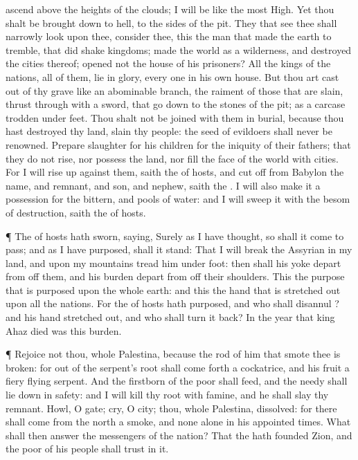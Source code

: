 {ascend above the
heights of the
clouds; I will be
like the most
High.
Yet thou shalt be brought
down to
hell, to the
sides of the
pit.
They that
see thee shall narrowly
look upon thee,
{}
consider thee,
{} this the
man that made the
earth to
tremble, that did
shake
kingdoms;
made the
world as a
wilderness, and
destroyed the
cities thereof;
{}
opened not the
house of his
prisoners?
All the
kings of the
nations,
{} all of them,
lie in
glory, every
one in his own
house.
But thou art cast
out of thy
grave like an
abominable
branch,
{} the
raiment of those that are
slain, thrust
through with a
sword, that go
down to the
stones of the
pit; as a
carcase trodden under
feet.
Thou shalt not be
joined with them in
burial, because thou hast
destroyed thy
land,
{}
slain thy
people: the
seed of
evildoers shall
never be
renowned.
Prepare
slaughter for his
children for the
iniquity of their
fathers; that they do
not
rise, nor
possess the
land, nor
fill the
face of the
world with
cities.
For I will rise
up against them,
saith the
{} of
hosts, and cut
off from
Babylon the
name, and
remnant, and
son, and
nephew,
saith the
{}.
I will also
make it a
possession for the
bittern, and
pools of
water: and I will
sweep it with the
besom of
destruction,
saith the
{} of
hosts.
\par }{\PP {}¶ The
{} of
hosts hath
sworn,
saying, Surely as I have
thought, so shall it come to pass; and as I have
purposed,
{} shall it
stand:
That I will
break the
Assyrian in my
land, and upon my
mountains tread him under
foot: then shall his
yoke
depart from off them, and his
burden
depart from off their
shoulders.
This
{} the
purpose that is
purposed upon the whole
earth: and this
{} the
hand that is stretched
out upon all the
nations.
For the
{} of
hosts hath
purposed, and who shall
disannul
{}? and his
hand
{} stretched
out, and who shall turn it
back?
In the
year that
king
Ahaz
died was this
burden.
\par }{\PP {}¶
Rejoice not thou, whole
Palestina, because the
rod of him that
smote thee is
broken: for out of the
serpent’s
root shall come
forth a
cockatrice, and his
fruit
{} a
fiery
flying
serpent.
And the
firstborn of the
poor shall
feed, and the
needy shall lie
down in
safety: and I will
kill thy
root with
famine, and he shall
slay thy
remnant.
Howl, O
gate;
cry, O
city; thou, whole
Palestina,
{}
dissolved: for there shall
come from the
north a
smoke, and none
{}
alone in his appointed
times.
What shall
{} then
answer the
messengers of the
nation? That the
{} hath
founded
Zion, and the
poor of his
people shall
trust in it.

}
